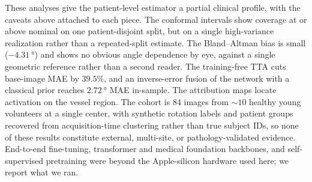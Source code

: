 These analyses give the patient-level estimator a partial clinical profile, with the caveats above attached to each piece. The conformal intervals show coverage at or above nominal on one patient-disjoint split, but on a single high-variance realization rather than a repeated-split estimate. The Bland--Altman bias is small ($-\SI{4.31}{\degree}$) and shows no obvious angle dependence by eye, against a single geometric reference rather than a second reader. The training-free TTA cuts base-image MAE by $39.5\%$, and an inverse-error fusion of the network with a classical prior reaches $\SI{2.72}{\degree}$ MAE in-sample. The attribution maps locate activation on the vessel region. The cohort is 84 images from $\sim\!10$ healthy young volunteers at a single center, with synthetic rotation labels and patient groups recovered from acquisition-time clustering rather than true subject IDs, so none of these results constitute external, multi-site, or pathology-validated evidence. End-to-end fine-tuning, transformer and medical foundation backbones, and self-supervised pretraining were beyond the Apple-silicon hardware used here; we report what we ran.
